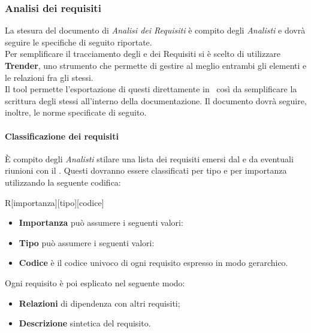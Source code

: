 		\subsubsection{Analisi dei requisiti}
		 La stesura del documento di \emph{Analisi dei Requisiti} è compito degli \emph{Analisti} e dovrà seguire le specifiche di seguito riportate.\\
		 Per semplificare il tracciamento degli  e dei Requisiti si è scelto di utilizzare \textbf{Trender}, uno strumento  che permette di gestire al meglio entrambi gli elementi e le relazioni fra gli stessi.\\
        Il tool permette l'esportazione di questi direttamente in \glossaryItem{\LaTeX}\, così da semplificare la scrittura degli stessi all'interno della documentazione. Il documento dovrà seguire, inoltre, le norme specificate di seguito.
    \paragraph{Classificazione dei requisiti}
      È compito degli \emph{Analisti} stilare una lista dei requisiti emersi dal  e da eventuali riunioni con il . Questi dovranno essere
      classificati per tipo e per importanza utilizzando la seguente codifica:
      \begin{center}
        R[importanza][tipo][codice]
      \end{center}
      \begin{itemize}
        \item \textbf{Importanza} può assumere i seguenti valori:
          \bgroup
          \egroup
        \item \textbf{Tipo} può assumere i seguenti valori:
          \bgroup
          \egroup
        \item \textbf{Codice} è il codice univoco di ogni requisito espresso in modo gerarchico.
      \end{itemize}
      Ogni requisito è poi esplicato nel seguente modo:
      \begin{itemize}
        \item \textbf{Relazioni} di dipendenza con altri requisiti;
        \item \textbf{Descrizione} sintetica del requisito.
      \end{itemize}

